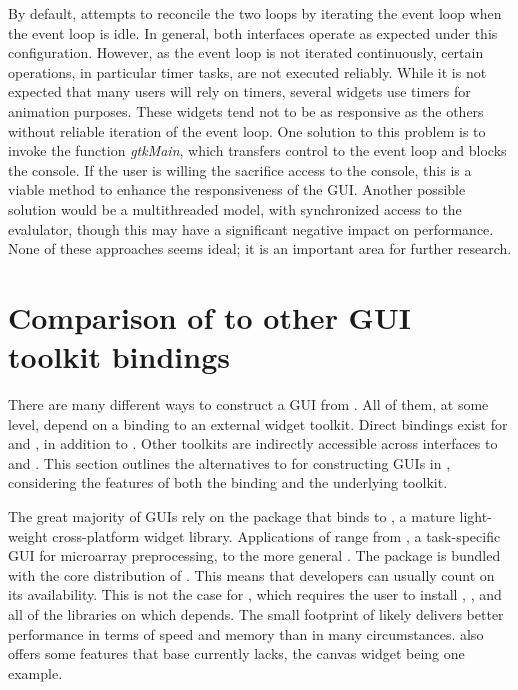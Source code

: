 \documentclass[article]{jss}
\begin{document}
By default,  attempts to reconcile the two loops by iterating the
 event loop when the  event loop is idle. In general, both
interfaces operate as expected under this configuration. However, as the
 event loop is not iterated continuously, certain operations,
in particular timer tasks, are not executed reliably. While it is not expected
that many  users will rely on timers, several  widgets use
timers for animation purposes. These widgets tend not to be as responsive
as the others without reliable iteration of the  event loop. One
solution to this problem is to invoke the function \emph{gtkMain}, which
transfers control to the  event loop and blocks the  console.
If the user is willing the sacrifice access to the  console, this is
a viable method to enhance the responsiveness of the  GUI. 
Another possible solution would be a multithreaded
model, with synchronized access to the  evalulator, though this
may have a significant negative impact on performance. None of these approaches 
seems ideal; it is an important area for further research.

\section[Comparison of RGtk2 to other R GUI toolkit bindings]{Comparison of  to other  GUI toolkit bindings}\label{sec:comparison}

There are many different ways to construct a GUI from . All of them,
at some level, depend on a binding to an external widget toolkit. Direct bindings
exist for  \citep{ousterhout,welch} and  \citep{wxwidgets}, 
in addition to . Other toolkits are indirectly accessible across 
interfaces to  \citep{DCOM} and  \citep{Java}. 
This section outlines the alternatives to  for
constructing GUIs in , considering the features of both the
 binding and the underlying toolkit.

The great majority of  GUIs rely on the  package 
\citep{Rnews:Dalgaard:2001a, Rnews:Dalgaard:2002} that binds 
 to  \citep{ousterhout,welch}, a mature light-weight cross-platform
widget library. Applications of  range from  
\citep{limma}, a task-specific GUI for microarray preprocessing, to the more 
general  \citep{rcmndr}. The  package 
is bundled with the core distribution of 
. This means that developers can usually count on its availability.
This is not the case for , which requires the user
to install , , and all of the libraries on which 
depends. The small footprint of  likely delivers better performance in
terms of speed and memory than  in many circumstances. 
also offers some features that base  currently lacks, the canvas widget
being one example.
\end{document}
